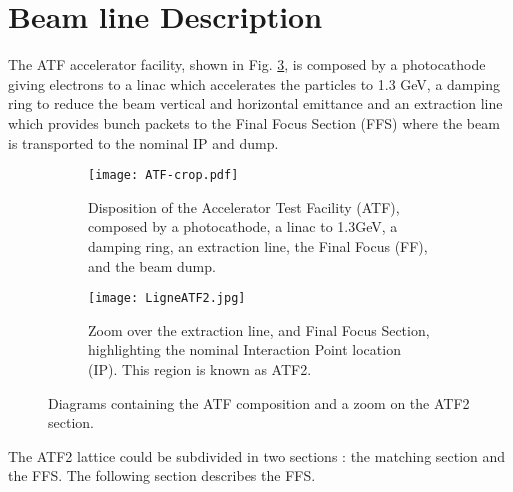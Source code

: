 {{\section{Beam line Description}
The ATF accelerator facility, shown in Fig. \ref{f:ATF}, is composed by a photocathode giving electrons to a linac which accelerates the particles to 1.3 GeV, a damping ring to reduce the beam vertical and horizontal emittance and an extraction line which provides bunch packets to the Final Focus Section (FFS) where the beam is transported to the nominal IP and dump.\par
\begin{figure}[htb]
\centering
\begin{subfigure}[b]{1.0\textwidth}
\texttt{[image: ATF-crop.pdf]}\caption{Disposition of the Accelerator Test Facility (ATF), composed by a photocathode, a linac to 1.3GeV, a damping ring, an extraction line, the Final Focus (FF), and the beam dump.}\label{f:ATF_ATF2}
\end{subfigure}
\begin{subfigure}[b]{1.0\textwidth}
\texttt{[image: LigneATF2.jpg]}\caption{Zoom over the extraction line, and Final Focus Section, highlighting the nominal Interaction Point location (IP). This region is known as ATF2.}\label{f:ATF2layout}
\end{subfigure}\caption{Diagrams containing the ATF composition and a zoom on the ATF2 section.}\label{f:ATF}
\end{figure}
The ATF2 lattice could be subdivided in two sections : the matching section and the FFS. The following section describes the FFS.\par
}}
